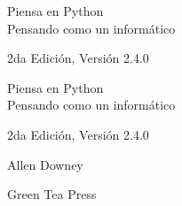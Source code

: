 \documentclass[10pt]{book}
\newcommand{\theversion}{2da Edición, Versión 2.4.0}
\newcommand{\thedate}{}
\begin{document}
\begin{latexonly}

\renewcommand{\blankpage}{\thispagestyle{empty} \quad \newpage}



\thispagestyle{empty}

\begin{flushright}
\vspace*{2.0in}

\begin{spacing}{3}
{\huge Piensa en Python}\\
{\Large Pensando como un informático}
\end{spacing}

\vspace{0.25in}

\theversion

\thedate

\vfill

\end{flushright}


\blankpage
\blankpage

\pagebreak
\thispagestyle{empty}

\begin{flushright}
\vspace*{2.0in}

\begin{spacing}{3}
{\huge Piensa en Python}\\
{\Large Pensando como un informático}
\end{spacing}

\vspace{0.25in}

\theversion

\thedate

\vspace{1in}


{\Large
Allen Downey\\
}


\vspace{0.5in}

{\Large Green Tea Press}


\end{flushright}
\end{latexonly}
\end{document}
